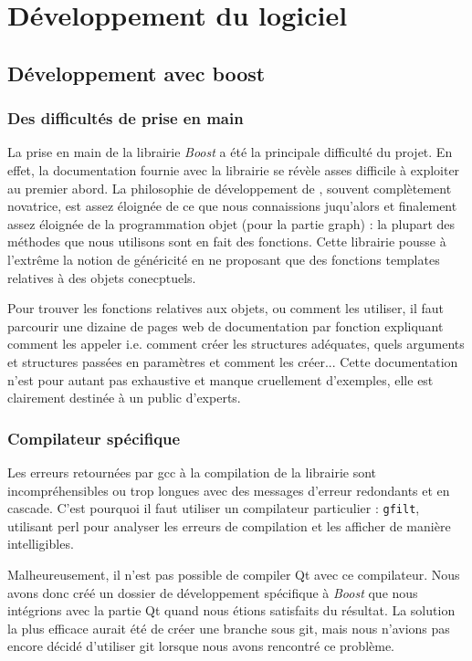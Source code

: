 \section{Développement du logiciel}
\subsection{Développement avec boost}
\subsubsection{Des difficultés de prise en main}
La prise en main de la librairie \textit{Boost} a été la principale difficulté du projet. En effet, la documentation fournie avec la librairie se r\'ev\`ele asses difficile \`a exploiter au premier abord. La philosophie de développement de \boost, souvent compl\`etement novatrice, est assez éloignée de ce que nous connaissions juqu'alors et finalement assez éloignée de la programmation objet (pour la partie graph) : la plupart des méthodes que nous utilisons sont en fait des fonctions. Cette librairie pousse \`a l'extr\^eme la notion de g\'en\'ericit\'e en ne proposant que des fonctions templates relatives \`a des objets conecptuels.

Pour trouver les fonctions relatives aux objets, ou comment les utiliser, il faut parcourir une dizaine de pages web de documentation par fonction expliquant comment les appeler i.e. comment créer les structures adéquates, quels arguments et structures passées en paramètres et comment les créer... Cette documentation n'est pour autant pas exhaustive et manque cruellement d'exemples, elle est clairement destinée à un public d'experts.

\subsubsection {Compilateur spécifique}
Les erreurs retournées par gcc à la compilation de la librairie sont incompréhensibles ou trop longues avec des messages d'erreur redondants et en cascade. C'est pourquoi il faut utiliser un compilateur particulier : \verb|gfilt|, utilisant perl pour analyser les erreurs de compilation et les afficher de mani\`ere intelligibles. 

Malheureusement, il n'est pas possible de compiler Qt avec ce compilateur. Nous avons donc créé un dossier de développement spécifique à \textit{Boost} que nous int\'egrions avec la partie Qt quand nous étions satisfaits du résultat. La solution la plus efficace aurait été de créer une branche sous git, mais nous n'avions pas encore décidé d'utiliser git lorsque nous avons rencontré ce problème.

